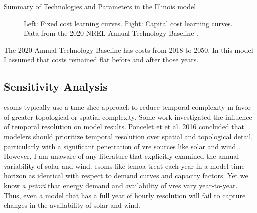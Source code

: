 \begin{table}[H]
  \centering
  \caption{Summary of Technologies and Parameters in the Illinois model}
  \label{tab:il-tech}
  \resizebox{\textwidth}{!}{
  
  } %
\end{table}


\begin{figure}[H]
  \begin{minipage}{0.5\textwidth}
    \centering
    \resizebox{\textwidth}{!}{}
  \end{minipage}
  \begin{minipage}{0.5\textwidth}
    \centering
    \resizebox{\textwidth}{!}{}
  \end{minipage}
  \caption{Left: Fixed cost learning curves. Right: Capital cost learning curves.
  Data from the 2020 NREL Annual Technology Baseline \cite{nrel_2020_2020}.}
  \label{fig:costs}
\end{figure}

The 2020 Annual Technology Baseline has costs from 2018 to 2050. In this model
I assumed that costs remained flat before and after those years.

\subsection{Sensitivity Analysis}

\glspl{esom} typically use a time slice approach to reduce temporal complexity
in favor of greater topological or spatial complexity. Some work investigated the
influence of temporal resolution on model results. Poncelet et et al. 2016
concluded that modelers should prioritize temporal resolution over spatial and
topological detail, particularly with a significant penetration of \gls{vre}
sources like solar and wind \cite{poncelet_impact_2016}. However,
I am unaware of any literature that explicitly examined the annual variability
of solar and wind. \glspl{esom} like \gls{temoa} treat each year in a model
time horizon as identical with respect to demand curves and capacity factors. Yet
we know \textit{a priori} that energy demand and availability of \glspl{vre}
vary year-to-year. Thus, even a model that has a full year of hourly resolution
will fail to capture changes in the availability of solar and wind.

